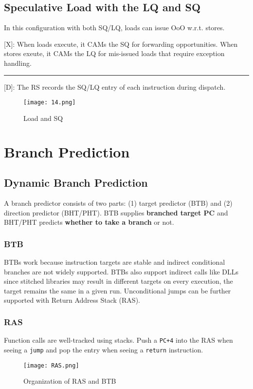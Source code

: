 \documentclass{article}
\begin{document}
\begin{multicols*}{2}
\subsection*{Speculative Load with the LQ and SQ}

In this configuration with both SQ/LQ, loads can issue OoO w.r.t. stores. 

\noindent
{[X]}: When loads execute, it CAMs the SQ for forwarding opportunities. When stores exeute, it CAMs the LQ for mis-issued loads that require exception handling.
\medskip\hrule\medskip\noindent
{[D]}: The RS records the SQ/LQ entry of each instruction during dispatch.

\begin{figure*}[ht]
    \centering
    {\texttt{[image: 14.png]}}
  \caption{Load and SQ}
\end{figure*}

\section{Branch Prediction}
\subsection*{Dynamic Branch Prediction}
A branch predictor consists of two parts: (1) target predictor (BTB) and (2) direction predictor (BHT/PHT). BTB supplies \textbf{branched target PC} and BHT/PHT predicts \textbf{whether to take a branch} or not.

\subsubsection*{BTB}
BTBs work because instruction targets are stable and indirect conditional branches are not widely supported. BTBs also support indirect calls like DLLs since stitched libraries may result in different targets on every execution, the target remains the same in a given run. Unconditional jumps can be further supported with Return Address Stack (RAS).

\subsubsection*{RAS}
Function calls are well-tracked using stacks. Push a \texttt{PC+4} into the RAS when seeing a \texttt{jump} and pop the entry when seeing a \texttt{return} instruction.

\begin{figure}[H]
    \centering
    {\texttt{[image: RAS.png]}}
  \caption{Organization of RAS and BTB}
\end{figure}


\end{multicols*}
\end{document}
